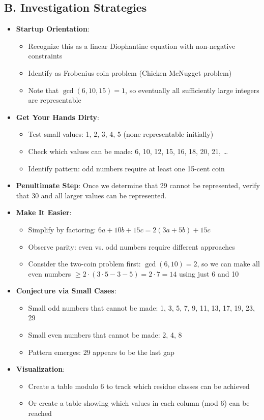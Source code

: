 \documentclass[12pt]{article}
\begin{document}
\begin{strategicbox}
\subsection*{B. Investigation Strategies}
\begin{itemize}[leftmargin=*]
    \item \textbf{Startup Orientation}: 
    \begin{itemize}
        \item Recognize this as a linear Diophantine equation with non-negative constraints
        \item Identify as Frobenius coin problem (Chicken McNugget problem)
        \item Note that $\gcd(6, 10, 15) = 1$, so eventually all sufficiently large integers are representable
    \end{itemize}
    \item \textbf{Get Your Hands Dirty}: 
    \begin{itemize}
        \item Test small values: 1, 2, 3, 4, 5 (none representable initially)
        \item Check which values can be made: 6, 10, 12, 15, 16, 18, 20, 21, \ldots
        \item Identify pattern: odd numbers require at least one 15-cent coin
    \end{itemize}
    \item \textbf{Penultimate Step}: Once we determine that 29 cannot be represented, verify that 30 and all larger values can be represented.
    \item \textbf{Make It Easier}: 
    \begin{itemize}
        \item Simplify by factoring: $6a + 10b + 15c = 2(3a + 5b) + 15c$
        \item Observe parity: even vs. odd numbers require different approaches
        \item Consider the two-coin problem first: $\gcd(6, 10) = 2$, so we can make all even numbers $\geq 2 \cdot (3 \cdot 5 - 3 - 5) = 2 \cdot 7 = 14$ using just 6 and 10
    \end{itemize}
    \item \textbf{Conjecture via Small Cases}: 
    \begin{itemize}
        \item Small odd numbers that cannot be made: 1, 3, 5, 7, 9, 11, 13, 17, 19, 23, 29
        \item Small even numbers that cannot be made: 2, 4, 8
        \item Pattern emerges: 29 appears to be the last gap
    \end{itemize}
    \item \textbf{Visualization}: 
    \begin{itemize}
        \item Create a table modulo 6 to track which residue classes can be achieved
        \item Or create a table showing which values in each column (mod 6) can be reached
    \end{itemize}
\end{itemize}


\end{strategicbox}
\end{document}
